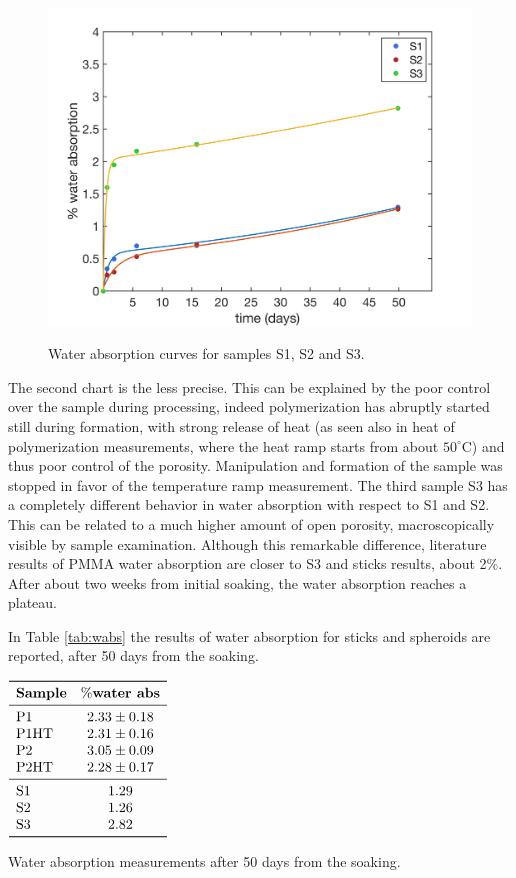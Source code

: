 \documentclass[a4paper, 11pt]{article}
\begin{document}
\begin{figure}[htp]
\centering
{\includegraphics[scale=0.35]{wabs_s}}
\captionsetup{justification=centering}
\caption{Water absorption curves for samples S1, S2 and S3.}
\label{fig:wabs2}
\end{figure}

The second chart is the less precise. This can be explained by the poor control over the sample during processing, indeed polymerization has abruptly started still during formation, with strong release of heat (as seen also in heat of polymerization measurements, where the heat ramp starts from about $50^\circ$C) and thus poor control of the porosity. Manipulation and formation of the sample was stopped in favor of the temperature ramp measurement. The third sample S3 has a completely different behavior in water absorption with respect to S1 and S2. This can be related to a much higher amount of open porosity, macroscopically visible by sample examination. Although this remarkable difference, literature results of PMMA water absorption are closer to S3 and sticks results, about 2\%. After about two weeks from initial soaking, the water absorption reaches a plateau. 

In Table \ref{tab:wabs} the results of water absorption for sticks and spheroids are reported, after 50 days from the soaking. 
\begin{table}[htp]
\centering
$
\begin{array}{lc}
\toprule
\textbf{Sample} & \textbf{$\%$water abs}  \\
\midrule
\text{P1} & 2.33 \pm0.18 \\
\text{P1HT} & 2.31\pm0.16 \\
\text{P2} & 3.05\pm0.09 \\
\text{P2HT} & 2.28\pm0.17 \\
\midrule
\text{S1} & 1.29 \\
\text{S2} & 1.26 \\
\text{S3} & 2.82 \\
\bottomrule
\end{array}
$
\caption{Water absorption measurements after 50 days from the soaking.}
\label{tab:wabs}
\end{table}\\
\end{document}
